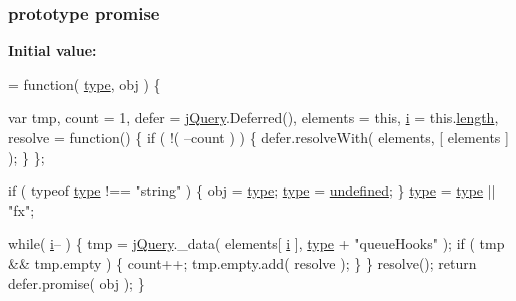 \subsubsection[{promise}]{ {\bf prototype} promise}\label{jquery-1_810_82-vsdoc_8js_a06426ace6e929cd19d94010b6c27109d}
{\bfseries Initial value\+:}
\begin{DoxyCode}
= \textcolor{keyword}{function}( \hyperlink{jquery-1_810_82-vsdoc_8js_a3940565e83a9bfd10d95ffd27536da91}{type}, obj ) \{


        var tmp,
            count = 1,
            defer = \hyperlink{jquery-1_810_82-vsdoc_8js_add5237586d970a38a81f990e8eb28c6c}{jQuery}.Deferred(),
            elements = \textcolor{keyword}{this},
            \hyperlink{_bibabook_2_scripts_2respond_8min_8js_a5e25b1d1bed9ab5f3174b76d6a722180}{i} = this.\hyperlink{jquery-1_810_82-vsdoc_8js_aa7de35d58da66d9944ab9cbe82c19640}{length},
            resolve = \textcolor{keyword}{function}() \{
                \textcolor{keywordflow}{if} ( !( --count ) ) \{
                    defer.resolveWith( elements, [ elements ] );
                \}
            \};

        \textcolor{keywordflow}{if} ( typeof \hyperlink{jquery-1_810_82-vsdoc_8js_a3940565e83a9bfd10d95ffd27536da91}{type} !== \textcolor{stringliteral}{"string"} ) \{
            obj = \hyperlink{jquery-1_810_82-vsdoc_8js_a3940565e83a9bfd10d95ffd27536da91}{type};
            \hyperlink{jquery-1_810_82-vsdoc_8js_a3940565e83a9bfd10d95ffd27536da91}{type} = \hyperlink{jquery-1_810_82-vsdoc_8js_a08113a236cc18d2a9d5ce27e638012be}{undefined};
        \}
        \hyperlink{jquery-1_810_82-vsdoc_8js_a3940565e83a9bfd10d95ffd27536da91}{type} = \hyperlink{jquery-1_810_82-vsdoc_8js_a3940565e83a9bfd10d95ffd27536da91}{type} || \textcolor{stringliteral}{"fx"};

        \textcolor{keywordflow}{while}( \hyperlink{_bibabook_2_scripts_2respond_8min_8js_a5e25b1d1bed9ab5f3174b76d6a722180}{i}-- ) \{
            tmp = \hyperlink{jquery-1_810_82-vsdoc_8js_add5237586d970a38a81f990e8eb28c6c}{jQuery}.\_data( elements[ \hyperlink{_bibabook_2_scripts_2respond_8min_8js_a5e25b1d1bed9ab5f3174b76d6a722180}{i} ], \hyperlink{jquery-1_810_82-vsdoc_8js_a3940565e83a9bfd10d95ffd27536da91}{type} + \textcolor{stringliteral}{"queueHooks"} );
            \textcolor{keywordflow}{if} ( tmp && tmp.empty ) \{
                count++;
                tmp.empty.add( resolve );
            \}
        \}
        resolve();
        \textcolor{keywordflow}{return} defer.promise( obj );
    \}
\end{DoxyCode}
\hypertarget{jquery-1_810_82-vsdoc_8js_af17be84954030af6c2286f5da385d41b}{}

